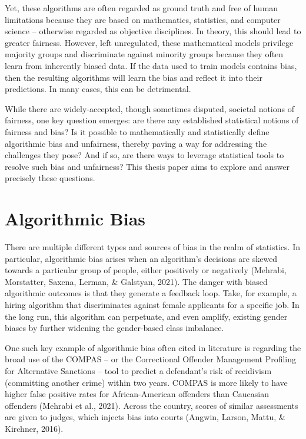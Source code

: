 \documentclass[12pt, twoside]{amherstthesis}
\begin{document}
Yet, these algorithms are often regarded as ground truth and free of human limitations because they are based on mathematics, statistics, and computer science -- otherwise regarded as objective disciplines. In theory, this should lead to greater fairness. However, left unregulated, these mathematical models privilege majority groups and discriminate against minority groups because they often learn from inherently biased data. If the data used to train models contains bias, then the resulting algorithms will learn the bias and reflect it into their predictions. In many cases, this can be detrimental.

While there are widely-accepted, though sometimes disputed, societal notions of fairness, one key question emerges: are there any established statistical notions of fairness and bias? Is it possible to mathematically and statistically define algorithmic bias and unfairness, thereby paving a way for addressing the challenges they pose? And if so, are there ways to leverage statistical tools to resolve such bias and unfairness? This thesis paper aims to explore and answer precisely these questions.

\hypertarget{algorithmic-bias}{%
\section{Algorithmic Bias}\label{algorithmic-bias}}

There are multiple different types and sources of bias in the realm of statistics. In particular, algorithmic bias arises when an algorithm's decisions are skewed towards a particular group of people, either positively or negatively (Mehrabi, Morstatter, Saxena, Lerman, \& Galstyan, 2021). The danger with biased algorithmic outcomes is that they generate a feedback loop. Take, for example, a hiring algorithm that discriminates against female applicants for a specific job. In the long run, this algorithm can perpetuate, and even amplify, existing gender biases by further widening the gender-based class imbalance.

One such key example of algorithmic bias often cited in literature is regarding the broad use of the COMPAS -- or the Correctional Offender Management Profiling for Alternative Sanctions -- tool to predict a defendant's risk of recidivism (committing another crime) within two years. COMPAS is more likely to have higher false positive rates for African-American offenders than Caucasian offenders (Mehrabi et al., 2021). Across the country, scores of similar assessments are given to judges, which injects bias into courts (Angwin, Larson, Mattu, \& Kirchner, 2016).
\end{document}

